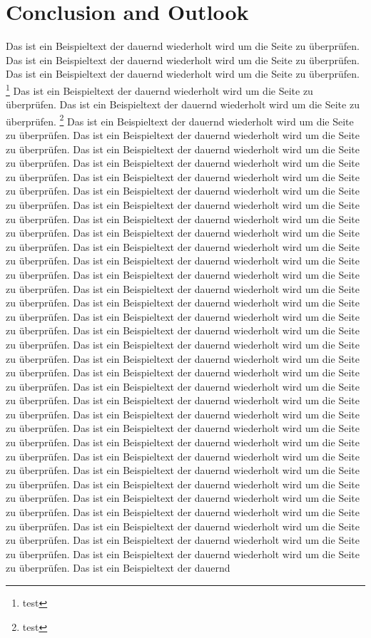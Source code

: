 \section{Conclusion and Outlook}
\label{cha:summary}
Das ist ein Beispieltext der dauernd wiederholt wird um die Seite zu überprüfen.
Das ist ein Beispieltext der dauernd wiederholt wird um die Seite zu überprüfen.  Das ist ein Beispieltext der dauernd wiederholt wird um die Seite zu überprüfen. \footnote{test} Das ist ein Beispieltext der dauernd wiederholt wird um die Seite zu überprüfen. Das ist ein Beispieltext der dauernd wiederholt wird um die Seite zu überprüfen. \footnote{test} Das ist ein Beispieltext der dauernd wiederholt wird um die Seite zu überprüfen. Das ist ein Beispieltext der dauernd wiederholt wird um die Seite zu überprüfen. Das ist ein Beispieltext der dauernd wiederholt wird um die Seite zu überprüfen. Das ist ein Beispieltext der dauernd wiederholt wird um die Seite zu überprüfen. Das ist ein Beispieltext der dauernd wiederholt wird um die Seite zu überprüfen. Das ist ein Beispieltext der dauernd wiederholt wird um die Seite zu überprüfen. Das ist ein Beispieltext der dauernd wiederholt wird um die Seite zu überprüfen. Das ist ein Beispieltext der dauernd wiederholt wird um die Seite zu überprüfen. Das ist ein Beispieltext der dauernd wiederholt wird um die Seite zu überprüfen. Das ist ein Beispieltext der dauernd wiederholt wird um die Seite zu überprüfen. Das ist ein Beispieltext der dauernd wiederholt wird um die Seite zu überprüfen. Das ist ein Beispieltext der dauernd wiederholt wird um die Seite zu überprüfen. Das ist ein Beispieltext der dauernd wiederholt wird um die Seite zu überprüfen. Das ist ein Beispieltext der dauernd wiederholt wird um die Seite zu überprüfen. Das ist ein Beispieltext der dauernd wiederholt wird um die Seite zu überprüfen. Das ist ein Beispieltext der dauernd wiederholt wird um die Seite zu überprüfen. Das ist ein Beispieltext der dauernd wiederholt wird um die Seite zu überprüfen. Das ist ein Beispieltext der dauernd wiederholt wird um die Seite zu überprüfen. Das ist ein Beispieltext der dauernd wiederholt wird um die Seite zu überprüfen. Das ist ein Beispieltext der dauernd wiederholt wird um die Seite zu überprüfen. Das ist ein Beispieltext der dauernd wiederholt wird um die Seite zu überprüfen. Das ist ein Beispieltext der dauernd wiederholt wird um die Seite zu überprüfen. Das ist ein Beispieltext der dauernd wiederholt wird um die Seite zu überprüfen. Das ist ein Beispieltext der dauernd wiederholt wird um die Seite zu überprüfen. Das ist ein Beispieltext der dauernd wiederholt wird um die Seite zu überprüfen. Das ist ein Beispieltext der dauernd wiederholt wird um die Seite zu überprüfen. Das ist ein Beispieltext der dauernd wiederholt wird um die Seite zu überprüfen. Das ist ein Beispieltext der dauernd wiederholt wird um die Seite zu überprüfen. Das ist ein Beispieltext der dauernd wiederholt wird um die Seite zu überprüfen. Das ist ein Beispieltext der dauernd wiederholt wird um die Seite zu überprüfen. Das ist ein Beispieltext der dauernd wiederholt wird um die Seite zu überprüfen. Das ist ein Beispieltext der dauernd wiederholt wird um die Seite zu überprüfen. Das ist ein Beispieltext der dauernd 
